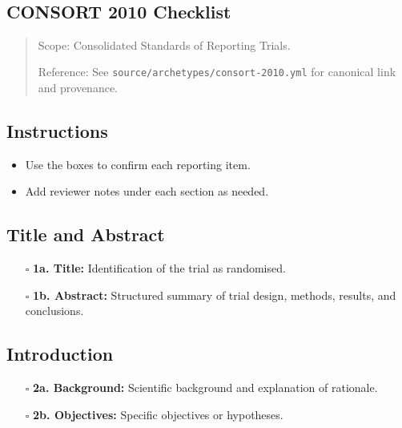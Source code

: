 \documentclass[11pt]{article}
\def\tightlist{}
\begin{document}
\begin{center}
{\LARGE }\\[4pt]
\normalsize 
\end{center}
\vspace{1em}

\begin{Form}

\section{CONSORT 2010 Checklist}\label{consort-2010-checklist}

\begin{quote}
Scope: Consolidated Standards of Reporting Trials.

Reference: See \texttt{source/archetypes/consort-2010.yml} for canonical
link and provenance.
\end{quote}

\subsection{Instructions}\label{instructions}

\begin{itemize}
\tightlist
\item
  Use the boxes to confirm each reporting item.
\item
  Add reviewer notes under each section as needed.
\end{itemize}

\subsection{Title and Abstract}\label{title-and-abstract}

\begin{itemize}
\tightlist
\item[$\square$]
  \textbf{1a. Title:} Identification of the trial as randomised.
\item[$\square$]
  \textbf{1b. Abstract:} Structured summary of trial design, methods,
  results, and conclusions.
\end{itemize}

\subsection{Introduction}\label{introduction}

\begin{itemize}
\tightlist
\item[$\square$]
  \textbf{2a. Background:} Scientific background and explanation of
  rationale.
\item[$\square$]
  \textbf{2b. Objectives:} Specific objectives or hypotheses.
\end{itemize}


\end{Form}
\end{document}
